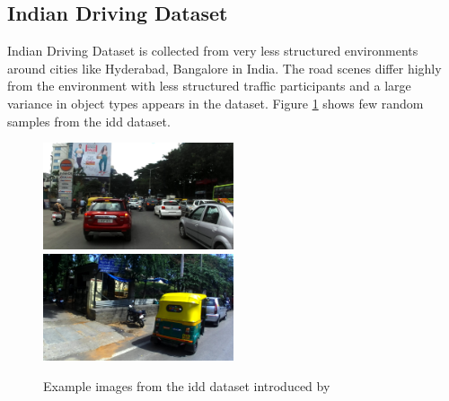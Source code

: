     
    \subsection{Indian Driving Dataset}
        Indian Driving Dataset is collected from very less structured environments around cities like Hyderabad, Bangalore in India. The road scenes differ highly from the environment with less structured traffic participants and a large variance in object types appears in the dataset. Figure \ref{fig:idd_samples} shows few random samples from the \acrshort{idd} dataset. 
        
        
    \begin{figure}[H]
        \includegraphics[width=0.5\textwidth]{images/dataset_images/IDD01.jpg}\hfill
        \includegraphics[width=0.5\textwidth]{images/dataset_images/IDD04.jpg}
        \caption[Sample images from \acrshort{idd} dataset]{Example images from the \acrshort{idd} dataset introduced by \citet{Varma2019IDDAD}}
        \label{fig:idd_samples}
    \end{figure}
    
